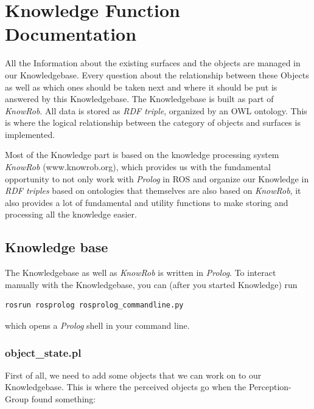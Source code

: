 \documentclass[main.tex]{subfiles}
\begin{document}
	\begingroup

	\renewcommand{\cleardoublepage}{}

	\renewcommand{\clearpage}{}
	\newpage
	\chapter{Knowledge Function Documentation}


All the Information about the existing surfaces and the objects are managed in our Knowledgebase. Every question about the relationship between these Objects as well as which ones should be taken next and where it should be put is answered by this Knowledgebase.  The Knowledgebase is built as part of \textit{KnowRob}. All data is stored as \textit{RDF triple}, organized by an OWL ontology. This is where the logical relationship between the category of objects and surfaces is implemented.

Most of the Knowledge part is based on the knowledge processing system \textit{KnowRob} (www.knowrob.org), which provides us with the fundamental opportunity to not only work with \textit{Prolog} in ROS and organize our Knowledge in \textit{RDF triples} based on ontologies that themselves are also based on \textit{KnowRob}, it also provides a lot of fundamental and utility functions to make storing and processing all the knowledge easier. 
		
\section{Knowledge base}

The Knowledgebase as well as \textit{KnowRob} is written in \textit{Prolog}. To interact manually with the Knowledgebase, you can (after you started Knowledge) run
\begin{lstlisting}
rosrun rosprolog rosprolog_commandline.py
\end{lstlisting}
which opens a \textit{Prolog} shell in your command line.

\subsection{object\_state.pl}

First of all, we need to add some objects that we can work on to our Knowledgebase. This is where the perceived objects go when the Perception-Group found something:
\end{document}

